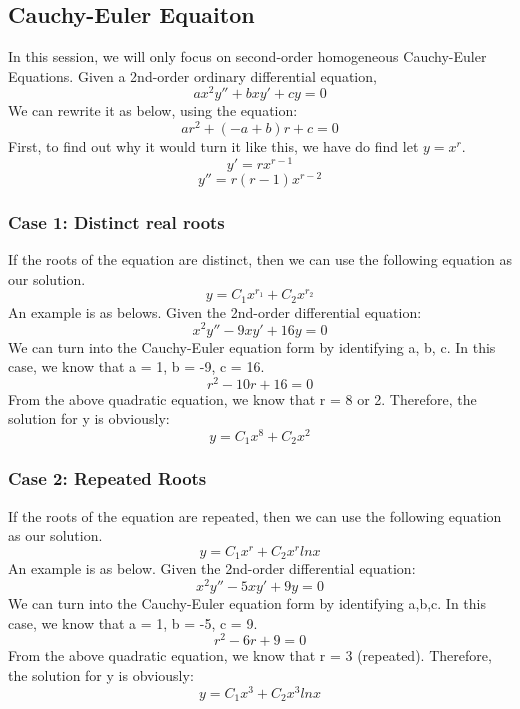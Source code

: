 \documentclass{article}
\begin{document}
\subsection{Cauchy-Euler Equaiton}
In this session, we will only focus on second-order homogeneous Cauchy-Euler Equations.
Given a 2nd-order ordinary differential equation,
\begin{equation*}
	ax^2y''+bxy'+cy=0
\end{equation*}
We can rewrite it as below, using the equation:
\begin{equation*}
	ar^2+(-a+b)r+c = 0
\end{equation*}
First, to find out why it would turn it like this, we have do find let $y =x^r$.
\begin{equation*}
	y' = rx^{r-1}
\end{equation*}
\begin{equation*}
	y''= r(r-1)x^{r-2}
\end{equation*}
\subsubsection{Case 1: Distinct real roots}
If the roots of the equation are distinct, then we can use the following equation as our solution.
\begin{equation*}
	y = C_1x^{r_1}+C_2x^{r_2}
\end{equation*}
An example is as belows. Given the 2nd-order differential equation:
\begin{equation*}
	x^2y''-9xy'+16y=0
\end{equation*}
We can turn into the Cauchy-Euler equation form by identifying a, b, c. In this case, we know that a = 1, b = -9, c = 16.
\begin{equation*}
	r^2-10r+16=0
\end{equation*}
From the above quadratic equation, we know that r = 8 or 2. Therefore, the solution for y is obviously:
\begin{equation*}
	y = C_1x^8+C_2x^2
\end{equation*}
\subsubsection{Case 2: Repeated Roots}
If the roots of the equation are repeated, then we can use the following equation as our solution.
\begin{equation*}
	y = C_1x^{r}+C_2x^rlnx
\end{equation*}
An example is as below. Given the 2nd-order differential equation:
\begin{equation*}
	x^2y''-5xy'+9y = 0
\end{equation*}
We can turn into the Cauchy-Euler equation form by identifying a,b,c. In this case, we know that a = 1, b = -5, c = 9.
\begin{equation*}
	r^2-6r+9=0
\end{equation*}
From the above quadratic equation, we know that r = 3 (repeated). Therefore, the solution for y is obviously:
\begin{equation*}
	y = C_1x^3+C_2x^3lnx
\end{equation*}
\end{document}
